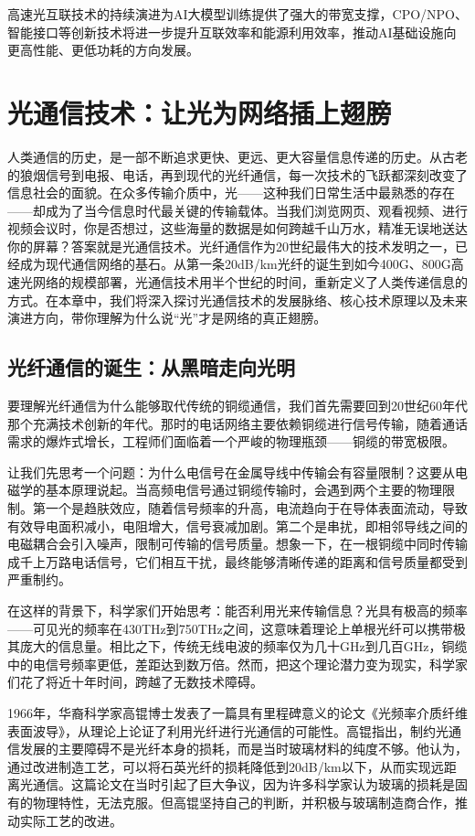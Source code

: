 高速光互联技术的持续演进为AI大模型训练提供了强大的带宽支撑，CPO/NPO、智能接口等创新技术将进一步提升互联效率和能源利用效率，推动AI基础设施向更高性能、更低功耗的方向发展。

\section{光通信技术：让光为网络插上翅膀}

人类通信的历史，是一部不断追求更快、更远、更大容量信息传递的历史。从古老的狼烟信号到电报、电话，再到现代的光纤通信，每一次技术的飞跃都深刻改变了信息社会的面貌。在众多传输介质中，光——这种我们日常生活中最熟悉的存在——却成为了当今信息时代最关键的传输载体。当我们浏览网页、观看视频、进行视频会议时，你是否想过，这些海量的数据是如何跨越千山万水，精准无误地送达你的屏幕？答案就是光通信技术。光纤通信作为20世纪最伟大的技术发明之一，已经成为现代通信网络的基石。从第一条20dB/km光纤的诞生到如今400G、800G高速光网络的规模部署，光通信技术用半个世纪的时间，重新定义了人类传递信息的方式。在本章中，我们将深入探讨光通信技术的发展脉络、核心技术原理以及未来演进方向，带你理解为什么说“光”才是网络的真正翅膀。

\subsection{光纤通信的诞生：从黑暗走向光明}

要理解光纤通信为什么能够取代传统的铜缆通信，我们首先需要回到20世纪60年代那个充满技术创新的年代。那时的电话网络主要依赖铜缆进行信号传输，随着通话需求的爆炸式增长，工程师们面临着一个严峻的物理瓶颈——铜缆的带宽极限。

让我们先思考一个问题：为什么电信号在金属导线中传输会有容量限制？这要从电磁学的基本原理说起。当高频电信号通过铜缆传输时，会遇到两个主要的物理限制。第一个是趋肤效应，随着信号频率的升高，电流趋向于在导体表面流动，导致有效导电面积减小，电阻增大，信号衰减加剧。第二个是串扰，即相邻导线之间的电磁耦合会引入噪声，限制可传输的信号质量。想象一下，在一根铜缆中同时传输成千上万路电话信号，它们相互干扰，最终能够清晰传递的距离和信号质量都受到严重制约。

在这样的背景下，科学家们开始思考：能否利用光来传输信息？光具有极高的频率——可见光的频率在430THz到750THz之间，这意味着理论上单根光纤可以携带极其庞大的信息量。相比之下，传统无线电波的频率仅为几十GHz到几百GHz，铜缆中的电信号频率更低，差距达到数万倍。然而，把这个理论潜力变为现实，科学家们花了将近十年时间，跨越了无数技术障碍。

1966年，华裔科学家高锟博士发表了一篇具有里程碑意义的论文《光频率介质纤维表面波导》，从理论上论证了利用光纤进行光通信的可能性。高锟指出，制约光通信发展的主要障碍不是光纤本身的损耗，而是当时玻璃材料的纯度不够。他认为，通过改进制造工艺，可以将石英光纤的损耗降低到20dB/km以下，从而实现远距离光通信。这篇论文在当时引起了巨大争议，因为许多科学家认为玻璃的损耗是固有的物理特性，无法克服。但高锟坚持自己的判断，并积极与玻璃制造商合作，推动实际工艺的改进。

